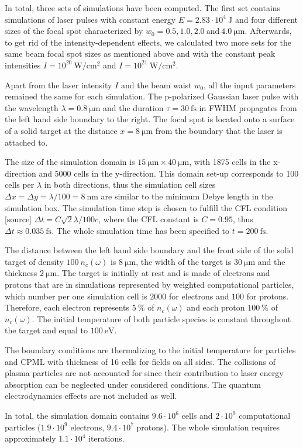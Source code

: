 In total, three sets of simulations have been computed. The first set contains simulations of laser pulses with constant energy $ E = 2.83 \cdot 10^{4} \ \mathrm{J} $ and four different sizes of the focal spot characterized by $ w_0 = 0.5, 1.0, 2.0 \ \mathrm{and} \ 4.0 \ \mathrm{\mu m} $. Afterwards, to get rid of the intensity-dependent effects, we calculated two more sets for the same beam focal spot sizes as mentioned above and with the constant peak intensities $ I = 10^{20} \ \mathrm{W/cm^2} $ and $ I = 10^{21} \ \mathrm{W/cm^2} $.

Apart from the laser intensity $ I $ and the beam waist $ w_0 $, all the input parameters remained the same for each simulation. The p-polarized Gaussian laser pulse with the wavelength $ \lambda = 0.8 \ \mathrm{\mu m} $ and the duration $ \tau = 30 \ \mathrm{fs} $ in FWHM propagates from the left hand side boundary to the right. The focal spot is located onto a surface of a solid target at the distance $ x = 8 \ \mathrm{\mu m} $ from the boundary that the laser is attached to. 

The size of the simulation domain is $ 15 \ \mathrm{\mu m} \times 40 \ \mathrm{\mu m} $, with 1875 cells in the x-direction and 5000 cells in the y-direction. This domain set-up corresponds to 100 cells per $ \lambda $ in both directions, thus the simulation cell sizes $ \Delta x = \Delta y = \lambda/100 = 8 \ \mathrm{nm} $ are similar to the minimum Debye length in the simulation box. The simulation time step is chosen to fulfill the CFL condition [source] $ \Delta t = C \sqrt{2} \lambda/ 100 c $, where the CFL constant is $ C = 0.95 $, thus $ \Delta t \approx 0.035 \ \mathrm{fs} $. The whole simulation time has been specified to $ t = 200 \ \mathrm{fs} $.

The distance between the left hand side boundary and the front side of the solid target of density $ 100 \ n_c \left(\omega \right) $ is $ 8 \ \mathrm{\mu m} $, the width of the target is $ 30 \ \mathrm{\mu m} $ and the thickness $ 2 \ \mathrm{\mu m} $. The target is initially at rest and is made of electrons and protons that are in simulations represented by weighted computational particles, which number per one simulation cell is $ 2000 $ for electrons and $ 100 $ for protons. Therefore, each electron represents $ 5 \ \% $ of $ n_c \left(\omega \right) $ and each proton $ 100 \ \% $ of $ n_c \left(\omega \right) $. The initial temperature of both particle species is constant throughout the target and equal to $ 100 \ \mathrm{eV} $.

The boundary conditions are thermalizing to the initial temperature for particles and CPML with thickness of 16 cells for fields on all sides. The collisions of plasma particles are not accounted for since their contribution to laser energy absorption can be neglected under considered conditions. The quantum electrodynamics effects are not included as well.

In total, the simulation domain contains $ 9.6 \cdot 10^{6} $ cells and $ 2 \cdot 10^{9} $ computational particles ($ 1.9 \cdot 10^{9} $ electrons, $ 9.4 \cdot 10^{7} $ protons). The whole simulation requires approximately $ 1.1 \cdot 10^{4} $ iterations.